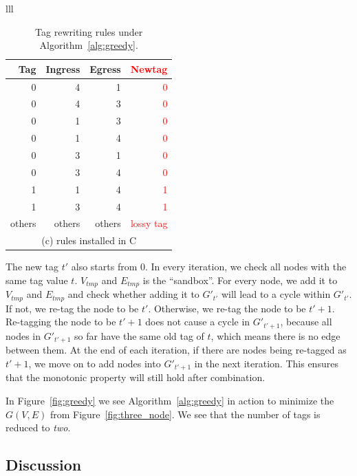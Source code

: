 \begin{table}[t]
\begin{tabular}{lll}
		\begin{tabular}{|r|r|r|r|}
			\hline
			Tag&  Ingress& Egress & \textcolor{red}{Newtag} \\
			\hline
			\hline
			0 & 4 & 1 & \textcolor{red}{0} \\
			\hline
			0 & 4 & 3 & \textcolor{red}{0} \\
			\hline
			0 & 1 & 3 & \textcolor{red}{0} \\
			\hline
			0 & 1 & 4 & \textcolor{red}{0} \\
			\hline
			0 & 3 & 1 & \textcolor{red}{0} \\
			\hline
			0 & 3 & 4 & \textcolor{red}{0} \\
			\hline
			1 & 1 & 4 & \textcolor{red}{1} \\
			\hline
			1 & 3 & 4 & \textcolor{red}{1} \\
			\hline
			others & others & others & \textcolor{red}{lossy tag} \\
			\hline
			\multicolumn{4}{c}{(c) rules installed in C} \\
		\end{tabular}
		
	\end{tabular}
	\caption{Tag rewriting rules under Algorithm~\ref{alg:greedy}.}
	\label{table:tagging_table2}
\end{table}

The new tag $t'$ also starts from 0. In every iteration, we check all nodes with
the same tag value $t$. $V_{tmp}$ and $E_{tmp}$ is the ``sandbox''. For every
node, we add it to $V_{tmp}$ and $E_{tmp}$ and check whether adding it to
$G'_{t'}$ will lead to a cycle within $G'_{t'}$. If not, we re-tag the node to
be $t'$. Otherwise, we re-tag the node to be $t'+1$.  Re-tagging the node to be
$t'+1$ does not cause a cycle in $G'_{t'+1}$, because all nodes in $G'_{t'+1}$
so far have the same old tag of $t$, which means there is no edge between them.
At the end of each iteration, if there are nodes being re-tagged as $t'+1$, we
move on to add nodes into $G'_{t'+1}$ in the next iteration.  This ensures that
the monotonic property will still hold after combination.

In Figure~\ref{fig:greedy} we see Algorithm~\ref{alg:greedy} in action to
minimize the $G(V,E)$ from Figure~\ref{fig:three_node}. We see that the number
of tags is reduced to {\em two}.

\subsection {Discussion}
\label{subsec:caveats}


